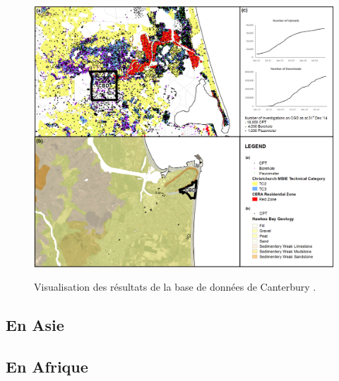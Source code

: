        
        \begin{figure}[t]
        \centering
        \includegraphics[width=1\textwidth]{cgd.png}
        \label{image-cdg}
        \caption{Visualisation des résultats de la base de données de Canterbury .}
        \end{figure}
        \subsection{En Asie}
         \paragraph{}

         \subsection{En Afrique}
